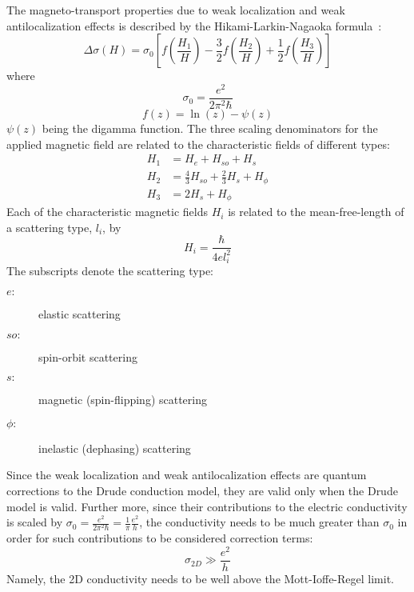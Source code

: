 The magneto-transport properties due to weak localization and weak antilocalization effects is described by the Hikami-Larkin-Nagaoka formula~\cite{WL_HLN, bergmann1984}:%
\begin{equation}\label{eq:hln}
    \Delta\sigma(H) = \sigma_0\left[f\left(\frac{H_1}{H}\right) - \frac{3}{2}f\left(\frac{H_2}{H}\right) + \frac{1}{2}f\left(\frac{H_3}{H}\right)\right]
\end{equation}%
where%
\begin{equation}\label{eq:sigma0}
    \sigma_0 = \frac{e^2}{2\pi^2\hbar}
\end{equation}
\begin{equation}
    f(z) = \ln(z) - \psi(z)
\end{equation}
$\psi(z)$ being the digamma function. The three scaling denominators for the applied magnetic field are related to the characteristic fields of different types:%
\begin{align}
    H_1 &= H_e + H_{so} + H_s\nonumber\\
    H_2 &= \frac{4}{3}H_{so} + \frac{2}{3}H_s + H_\phi\\
    H_3 &= 2H_s + H_\phi\nonumber
\end{align}
Each of the characteristic magnetic fields $H_i$ is related to the mean-free-length of a scattering type, $l_i$, by
\begin{equation}
    H_i = \frac{\hbar}{4el_i^2}
\end{equation}
The subscripts denote the scattering type:%
\begin{description}
    \item [$e:$] elastic scattering
    \item [$so:$] spin-orbit scattering
    \item [$s:$] magnetic (spin-flipping) scattering
    \item [$\phi:$] inelastic (dephasing) scattering
\end{description}

Since the weak localization and weak antilocalization effects are quantum corrections to the Drude conduction model, they are valid only when the Drude model is valid. Further more, since their contributions to the electric conductivity is scaled by $\sigma_0 = \frac{e^2}{2\pi^2\hbar} = \frac{1}{\pi}\frac{e^2}{h}$, the conductivity needs to be much greater than $\sigma_0$ in order for such contributions to be considered correction terms:%
\begin{equation}\label{eq:sigma0}
    \sigma_{2D} \gg \frac{e^2}{h}
\end{equation}%
Namely, the 2D conductivity needs to be well above the Mott-Ioffe-Regel limit.